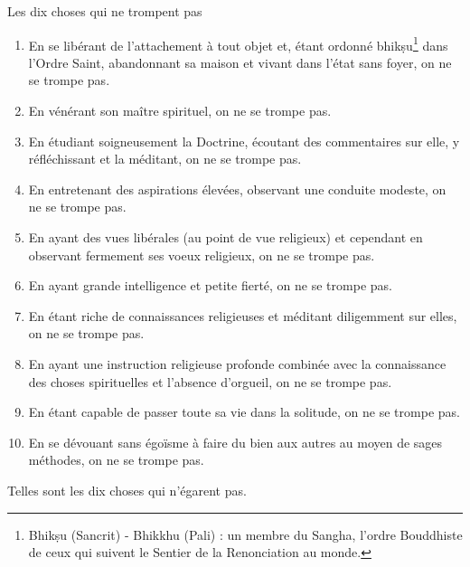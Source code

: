 \documentclass[10pt]{book}
\makeatletter
\renewcommand{\section}{\@startsection{section}{0}{0mm}
   {\baselineskip}
   {\baselineskip}{\normalfont\normalsize\scshape\centering}
}
\makeatother
\begin{document}
\section{Les dix choses qui ne trompent pas}
\begin{enumerate}[1.-]
\item En se libérant de l'attachement à tout objet et, étant ordonné bhikṣu\footnote{Bhikṣu (Sancrit) - Bhikkhu (Pali) : un membre du Sangha, l'ordre Bouddhiste de ceux qui suivent le Sentier de la Renonciation au monde.} dans l'Ordre Saint, abandonnant sa maison et vivant dans l'état sans foyer, on ne se trompe pas.
\item En vénérant son maître spirituel, on ne se trompe pas.
\item En étudiant soigneusement la Doctrine, écoutant des commentaires sur elle, y réfléchissant et la méditant, on ne se trompe pas.
\item En entretenant des aspirations élevées, observant une conduite modeste, on ne se trompe pas.
\item En ayant des vues libérales (au point de vue religieux) et cependant en observant fermement ses voeux religieux, on ne se trompe pas.
\item En ayant grande intelligence et petite fierté, on ne se trompe pas.
\item En étant riche de connaissances religieuses et méditant diligemment sur elles, on ne se trompe pas.
\item En ayant une instruction religieuse profonde combinée avec la connaissance des choses spirituelles et l'absence d'orgueil, on ne se trompe pas.
\item En étant capable de passer toute sa vie dans la solitude, on ne se trompe pas.
\item En se dévouant sans égoïsme à faire du bien aux autres au moyen de sages méthodes, on ne se trompe pas.
\end{enumerate}
Telles sont les dix choses qui n'égarent pas.
\end{document}
